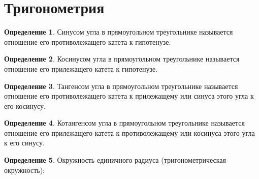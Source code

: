 \documentclass[12pt]{article}
\theoremstyle{definition}
\newtheorem{definition}{Определение}
\begin{document}
\section{Тригонометрия}
\begin{definition}
    Синусом угла в прямоугольном треугольнике называется отношение его противолежащего катета к гипотенузе.
\end{definition}
\begin{definition}
    Косинусом угла в прямоугольном треугольнике называется отношение его прилежащего катета к гипотенузе.
\end{definition}
\begin{definition}
    Тангенсом угла в прямоугольном треугольнике называется отношение его противолежащего катета к прилежащему или синуса этого угла к его косинусу.
\end{definition}
\begin{definition}
    Котангенсом угла в прямоугольном треугольнике называется отношение его прилежащего катета к противолежащему или косинуса этого угла к его синусу.
\end{definition}
\begin{definition}
    Окружность единичного радиуса (тригонометрическая окружность):
    \begin{center}
    \end{center}
\end{definition}
\end{document}
